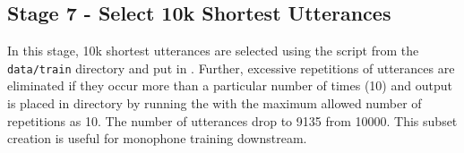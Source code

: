 \subsection{ Stage 7 - Select 10k Shortest Utterances }
In this stage, 10k shortest utterances are selected using the 
script from the \texttt{data/train} directory and put in . Further, excessive repetitions of utterances are eliminated if they occur more than a particular number of times (10) and output is placed in  directory by running the  with the maximum allowed number of repetitions as 10. The number of utterances drop to 9135 from 10000. This subset creation is useful for monophone training downstream.

